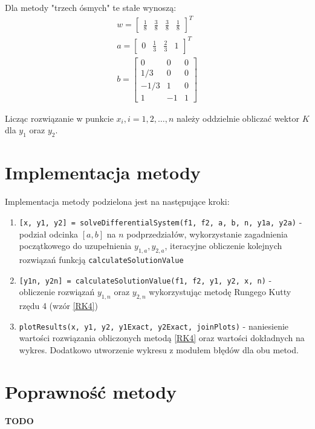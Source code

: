 \documentclass[12pt]{article}
\begin{document}
	Dla metody "trzech ósmych" te stałe wynoszą:
	\begin{align*}
		w = \begin{bmatrix}
			\frac{1}{8} & \frac{3}{8} & \frac{3}{8} & \frac{1}{8}
		\end{bmatrix}^T
		\\
		a = \begin{bmatrix}
			0 & \frac{1}{3} & \frac{2}{3} & 1
		\end{bmatrix}^T
		\\
		b = \begin{bmatrix}
			0 & 0 & 0 \\
			1/3 &  0  & 0 \\
			-1/3 & 1 & 0 \\
			1 & -1 &  1
		\end{bmatrix}
	\end{align*}
	
	Licząc rozwiązanie w punkcie $x_{i}, i = 1, 2, \dots, n$ należy oddzielnie obliczać wektor $K$ dla $y_1$ oraz $y_2$.
	
	
	
	\section{Implementacja metody}
	Implementacja metody podzielona jest na następujące kroki:
	\begin{enumerate}
		\item \texttt{[x, y1, y2] = solveDifferentialSystem(f1, f2, a, b, n, y1a, y2a)} - podział odcinka $[a, b]$ na $n$ podprzedziałów, wykorzystanie zagadnienia początkowego do uzupełnienia $y_{1, a}, y_{2, a}$, iteracyjne obliczenie kolejnych rozwiązań funkcją \texttt{calculateSolutionValue}
		
		\item \texttt{[y1n, y2n] = calculateSolutionValue(f1, f2, y1, y2, x, n)} - obliczenie rozwiązań $y_{1, n}$ oraz $y_{2, n}$ wykorzystując metodę Rungego Kutty rzędu 4 (wzór \eqref{RK4})
		
		\item \texttt{plotResults(x, y1, y2, y1Exact, y2Exact, joinPlots)} - naniesienie wartości rozwiązania obliczonych metodą \eqref{RK4} oraz wartości dokładnych na wykres. Dodatkowo utworzenie wykresu z modułem błędów dla obu metod.
	\end{enumerate}

	
	
	\section{Poprawność metody}
	\textbf{TODO}
	
\end{document}

